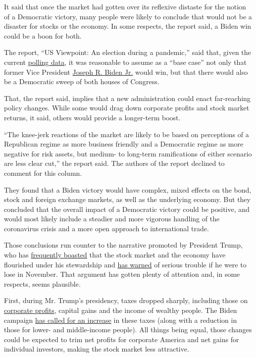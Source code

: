 It said that once the market had gotten over its reflexive distaste for
the notion of a Democratic victory, many people were likely to conclude
that would not be a disaster for stocks or the economy. In some
respects, the report said, a Biden win could be a boon for both.

The report, ``US Viewpoint: An election during a pandemic,'' said that,
given the current
\href{https://www.realclearpolitics.com/epolls/latest_polls/}{polling
data}, it was reasonable to assume as a ``base case'' not only that
former Vice President
\href{https://www.nytimes3xbfgragh.onion/interactive/2020/us/elections/joe-biden.html}{Joseph
R. Biden Jr.} would win, but that there would also be a Democratic sweep
of both houses of Congress.

That, the report said, implies that a new administration could enact
far-reaching policy changes. While some would drag down corporate
profits and stock market returns, it said, others would provide a
longer-term boost.

``The knee-jerk reactions of the market are likely to be based on
perceptions of a Republican regime as more business friendly and a
Democratic regime as more negative for risk assets, but medium- to
long-term ramifications of either scenario are less clear cut,'' the
report said. The authors of the report declined to comment for this
column.

They found that a Biden victory would have complex, mixed effects on the
bond, stock and foreign exchange markets, as well as the underlying
economy. But they concluded that the overall impact of a Democratic
victory could be positive, and would most likely include a steadier and
more vigorous handling of the coronavirus crisis and a more open
approach to international trade.

Those conclusions run counter to the narrative promoted by President
Trump, who has
\href{https://www.whitehouse.gov/briefings-statements/remarks-president-trump-jobs-numbers-report-2/}{frequently
boasted} that the stock market and the economy have flourished under his
stewardship and
\href{https://www.cnn.com/2020/07/08/investing/biden-trump-stock-market-election/index.html}{has
warned} of serious trouble if he were to lose in November. That argument
has gotten plenty of attention and, in some respects, seems plausible.

First, during Mr. Trump's presidency, taxes dropped sharply, including
those on
\href{https://www.nytimes3xbfgragh.onion/2018/12/27/us/politics/trump-tax-cuts-jobs-act.html}{corporate
profits}, capital gains and the income of wealthy people. The Biden
campaign
\href{https://www.nytimes3xbfgragh.onion/2020/03/04/business/2020-democrats-tax.html}{has
called for an increase} in these taxes (along with a reduction in those
for lower- and middle-income people). All things being equal, those
changes could be expected to trim net profits for corporate America and
net gains for individual investors, making the stock market less
attractive.

